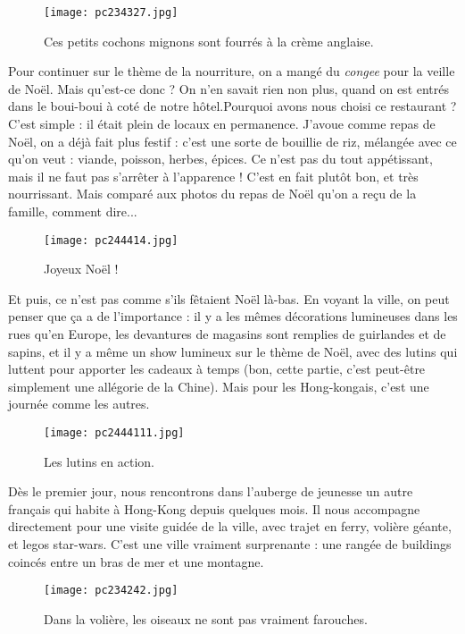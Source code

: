 \documentclass{book}
\begin{document}
\begin{figure}[h]
\centering
\texttt{[image: pc234327.jpg]}
\caption*{Ces petits cochons mignons sont fourrés à la crème anglaise.}
\end{figure}

Pour continuer sur le thème de la nourriture,  on a mangé du \emph{congee} pour la veille de Noël. Mais qu'est-ce donc ? On n'en savait rien non plus, quand on est entrés dans le boui-boui à coté de notre hôtel.Pourquoi avons nous choisi ce restaurant ? C'est simple : il était plein de locaux en permanence.  J'avoue comme repas de Noël, on a déjà fait plus festif : c'est une sorte de bouillie de riz, mélangée avec ce qu'on veut : viande, poisson, herbes, épices. Ce n'est pas du tout appétissant, mais il ne faut pas s'arrêter à l'apparence ! C'est en fait plutôt bon, et très nourrissant.  Mais comparé aux photos du repas de Noël qu'on a reçu de la famille, comment dire...


\begin{figure}[h]
\centering
\texttt{[image: pc244414.jpg]}
\caption*{Joyeux Noël !}
\end{figure}

Et puis, ce n'est pas comme s'ils fêtaient Noël là-bas. En voyant la ville, on peut penser que ça a de l'importance : il y a les mêmes décorations lumineuses dans les rues qu'en Europe, les devantures de magasins sont remplies de guirlandes et de sapins, et il y a même un show lumineux sur le thème de Noël, avec des lutins qui luttent pour apporter les cadeaux à temps (bon, cette partie, c'est peut-être simplement une allégorie de la Chine). Mais pour les Hong-kongais, c'est une journée comme les autres.


\begin{figure}[h]
\centering
\texttt{[image: pc2444111.jpg]}
\caption*{Les lutins en action.}
\end{figure}

Dès le premier jour, nous rencontrons dans l'auberge de jeunesse un autre français qui habite à Hong-Kong depuis quelques mois. Il nous accompagne directement pour une visite guidée de la ville, avec trajet en ferry, volière géante, et legos star-wars. C'est une ville vraiment surprenante : une rangée de buildings coincés entre un bras de mer et une montagne.


\begin{figure}[h]
\centering
\texttt{[image: pc234242.jpg]}
\caption*{Dans la volière, les oiseaux ne sont pas vraiment farouches.}
\end{figure}
\end{document}
